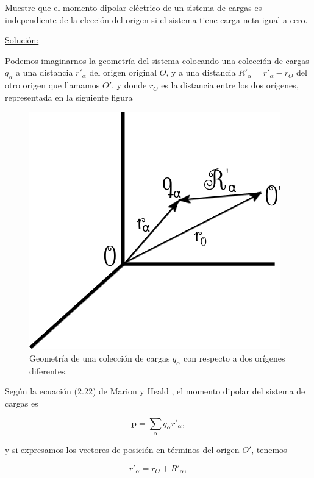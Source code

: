 \documentclass[a4paper,11pt]{article}
\numberwithin{equation}{section}
\begin{document}
Muestre que el momento dipolar eléctrico de un sistema de cargas es independiente 
de la elección del origen si el sistema tiene carga neta igual a cero.

\vspace{.3cm}

\underline{Solución:} \vspace{.3cm}

Podemos imaginarnos la geometría del sistema colocando una colección de cargas 
$q_\alpha$ a una distancia $r'_\alpha$ del origen original $O$, y a una distancia 
$R'_\alpha = r'_\alpha - r_O$ del otro origen que llamamos $O'$, y donde $r_O$ es 
la distancia entre los dos orígenes, representada en la siguiente figura 

\begin{figure}[H]
 \center 
 \includegraphics[scale=0.5]{problema3fig1}
 \caption{Geometría de una colección de cargas $q_\alpha$ con respecto a dos 
 orígenes diferentes.}
 \label{fig:problema3fig1}
\end{figure}

Según la ecuación (2.22) de Marion y Heald \cite{marion2}, el momento dipolar del sistema 
de cargas es 

\begin{equation}
 \mathbf{p} = \sum_\alpha q_\alpha r'_\alpha,
\end{equation}

y si expresamos los vectores de posición en términos del origen $O'$, tenemos 

\begin{equation}
 r'_\alpha = r_O + R'_\alpha,
\end{equation}
\end{document}
